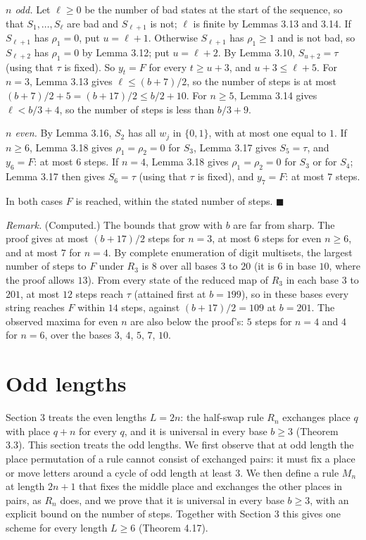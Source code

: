\documentclass[11pt,letterpaper]{article}
\theoremstyle{paperstyle}
\theoremstyle{paperstyledef}
\theoremstyle{paperstylerem}
\begin{document}
\emph{\(n\) odd.} Let \(\ell \geq 0\) be the number of bad states at the start of the sequence, so that \(S_1, \dots, S_\ell\) are bad and \(S_{\ell+1}\) is not; \(\ell\) is finite by Lemmas 3.13 and 3.14. If \(S_{\ell+1}\) has \(\rho_1 = 0\), put \(u = \ell + 1\). Otherwise \(S_{\ell+1}\) has \(\rho_1 \geq 1\) and is not bad, so \(S_{\ell+2}\) has \(\rho_1 = 0\) by Lemma 3.12; put \(u = \ell + 2\). By Lemma 3.10, \(S_{u+2} = \tau\) (using that \(\tau\) is fixed). So \(y_t = F\) for every \(t \geq u + 3\), and \(u + 3 \leq \ell + 5\). For \(n = 3\), Lemma 3.13 gives \(\ell \leq (b+7)/2\), so the number of steps is at most \((b+7)/2 + 5 = (b+17)/2 \leq b/2 + 10\). For \(n \geq 5\), Lemma 3.14 gives \(\ell < b/3 + 4\), so the number of steps is less than \(b/3 + 9\).

\emph{\(n\) even.} By Lemma 3.16, \(S_2\) has all \(w_j\) in \(\{0, 1\}\), with at most one equal to \(1\). If \(n \geq 6\), Lemma 3.18 gives \(\rho_1 = \rho_2 = 0\) for \(S_3\), Lemma 3.17 gives \(S_5 = \tau\), and \(y_6 = F\): at most \(6\) steps. If \(n = 4\), Lemma 3.18 gives \(\rho_1 = \rho_2 = 0\) for \(S_3\) or for \(S_4\); Lemma 3.17 then gives \(S_6 = \tau\) (using that \(\tau\) is fixed), and \(y_7 = F\): at most \(7\) steps.

In both cases \(F\) is reached, within the stated number of steps. \(\blacksquare\)

\emph{Remark.} (Computed.) The bounds that grow with \(b\) are far from sharp. The proof gives at most \((b+17)/2\) steps for \(n = 3\), at most \(6\) steps for even \(n \geq 6\), and at most \(7\) for \(n = 4\). By complete enumeration of digit multisets, the largest number of steps to \(F\) under \(R_3\) is \(8\) over all bases \(3\) to \(20\) (it is \(6\) in base \(10\), where the proof allows \(13\)). From every state of the reduced map of \(R_3\) in each base \(3\) to \(201\), at most \(12\) steps reach \(\tau\) (attained first at \(b = 199\)), so in these bases every string reaches \(F\) within \(14\) steps, against \((b+17)/2 = 109\) at \(b = 201\). The observed maxima for even \(n\) are also below the proof's: \(5\) steps for \(n = 4\) and \(4\) for \(n = 6\), over the bases \(3\), \(4\), \(5\), \(7\), \(10\).

\section{Odd lengths}\label{odd-lengths}

Section 3 treats the even lengths \(L = 2n\): the half-swap rule \(R_n\) exchanges place \(q\) with place \(q+n\) for every \(q\), and it is universal in every base \(b \geq 3\) (Theorem 3.3). This section treats the odd lengths. We first observe that at odd length the place permutation of a rule cannot consist of exchanged pairs: it must fix a place or move letters around a cycle of odd length at least \(3\). We then define a rule \(M_n\) at length \(2n+1\) that fixes the middle place and exchanges the other places in pairs, as \(R_n\) does, and we prove that it is universal in every base \(b \geq 3\), with an explicit bound on the number of steps. Together with Section 3 this gives one scheme for every length \(L \geq 6\) (Theorem 4.17).
\end{document}
